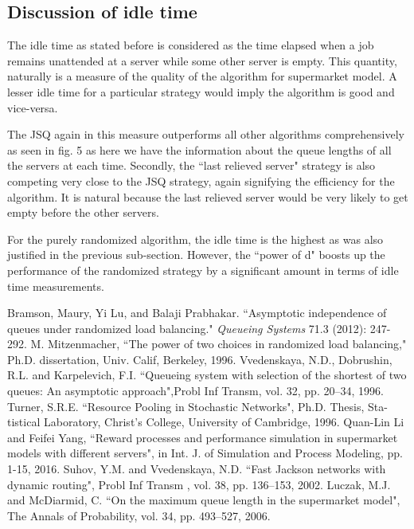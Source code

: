 \documentclass[a4paper,english,11pt]{article}
\begin{document}
\subsection{Discussion of idle time}
The idle time as stated before is considered as the time elapsed when a job remains unattended at a server while some other server is empty. This quantity, naturally is a measure of the quality of the algorithm for supermarket model. A lesser idle time for a particular strategy would imply the algorithm is good and vice-versa.
\par The JSQ again in this measure outperforms all other algorithms comprehensively as seen in fig. 5 as here we have the information about the queue lengths of all the servers at each time. Secondly, the ``last relieved server" strategy is also competing very close to the JSQ strategy, again signifying the efficiency for the algorithm. It is natural because the last relieved server would be very likely to get empty before the other servers.
\par For the purely randomized algorithm, the idle time is the highest as was also justified in the previous sub-section. However, the ``power of d" boosts up the performance of the randomized strategy by a significant amount in terms of idle time measurements.

\begin{thebibliography}{11}
Bramson, Maury, Yi Lu, and Balaji Prabhakar. ``Asymptotic independence of queues under randomized load balancing." \textit{Queueing Systems} 71.3 (2012): 247-292.
M. Mitzenmacher, ``The power of two choices in randomized load balancing," Ph.D. dissertation, Univ. Calif, Berkeley, 1996.
Vvedenskaya, N.D., Dobrushin, R.L. and Karpelevich, F.I. ``Queueing system
with selection of the shortest of two queues:  An asymptotic approach",Probl  Inf Transm, vol. 32, pp. 20–34, 1996.
Turner, S.R.E. ``Resource Pooling in Stochastic Networks", Ph.D. Thesis, Sta-
tistical Laboratory, Christ’s College, University of Cambridge, 1996.
Quan-Lin Li and Feifei Yang, ``Reward processes and performance simulation in
supermarket models with different servers", in Int. J. of Simulation and Process Modeling, pp. 1-15, 2016.
 Suhov, Y.M. and Vvedenskaya, N.D. ``Fast Jackson
networks with dynamic routing",
Probl Inf Transm , vol. 38, pp. 136–153, 2002.
 Luczak, M.J. and McDiarmid, C. ``On the maximum queue length in the
supermarket model", The Annals of Probability, vol. 34, pp. 493–527, 2006.
\end{thebibliography}
\end{document}
